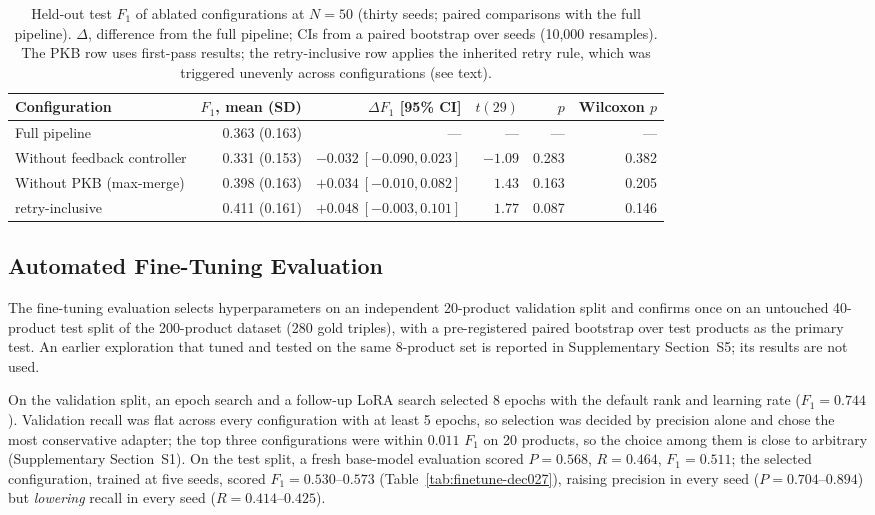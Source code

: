 \documentclass[11pt]{article}
\begin{document}
\begin{table}[htbp]
\centering
\caption{Held-out test $F_1$ of ablated configurations at $N=50$ (thirty
seeds; paired comparisons with the full pipeline). $\Delta$, difference
from the full pipeline; CIs from a paired bootstrap over seeds (10,000
resamples). The PKB row uses first-pass results; the retry-inclusive row
applies the inherited retry rule, which was triggered unevenly across
configurations (see text).}
\label{tab:ablation-n50}
\begin{adjustbox}{max width=\textwidth}
\begin{tabular}{@{}lrrrrr@{}}
\toprule
Configuration & $F_1$, mean (SD) & $\Delta F_1$ [95\% CI] & $t(29)$ & $p$ & Wilcoxon $p$ \\
\midrule
Full pipeline & 0.363 (0.163) & --- & --- & --- & --- \\
Without feedback controller & 0.331 (0.153) & $-0.032\ [-0.090, 0.023]$ & $-1.09$ & 0.283 & 0.382 \\
Without PKB (max-merge) & 0.398 (0.163) & $+0.034\ [-0.010, 0.082]$ & $1.43$ & 0.163 & 0.205 \\
\quad retry-inclusive & 0.411 (0.161) & $+0.048\ [-0.003, 0.101]$ & $1.77$ & 0.087 & 0.146 \\
\bottomrule
\end{tabular}
\end{adjustbox}
\end{table}

\subsection{Automated Fine-Tuning Evaluation}
\label{sec:results-finetuning}

The fine-tuning evaluation selects hyperparameters on an independent
20-product validation split and confirms once on an untouched 40-product
test split of the 200-product dataset (280 gold triples), with a
pre-registered paired bootstrap over test products as the primary test.
An earlier exploration that tuned and tested on the same 8-product set
is reported in Supplementary Section~S5; its results are not used.

On the validation split, an epoch search and a follow-up LoRA search
selected 8 epochs with the default rank and learning rate ($F_1=0.744$).
Validation recall was flat across every configuration with at least 5
epochs, so selection was decided by precision alone and chose the most
conservative adapter; the top three configurations were within $0.011$
$F_1$ on 20 products, so the choice among them is close to arbitrary
(Supplementary Section~S1).
On the test split, a fresh base-model evaluation scored $P=0.568$,
$R=0.464$, $F_1=0.511$; the selected configuration, trained at five
seeds, scored $F_1=0.530$--$0.573$ (Table~\ref{tab:finetune-dec027}),
raising precision in every seed ($P=0.704$--$0.894$) but \emph{lowering}
recall in every seed ($R=0.414$--$0.425$).
\end{document}
